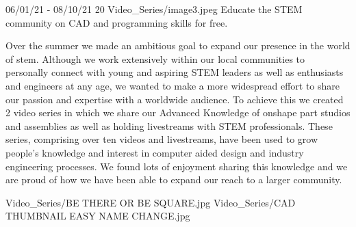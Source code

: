 {06/01/21 - 08/10/21}
{20}
{Video_Series/image3.jpeg}
{Educate the STEM community on CAD and programming skills for free.} 
{
Over the summer we made an ambitious goal to expand our presence in the world of stem. Although we work extensively within our local communities to personally connect with young and aspiring STEM leaders as well as enthusiasts and engineers at any age, we wanted to make a more widespread effort to share our passion and expertise with a worldwide audience. To achieve this we created 2 video series in which we share our Advanced Knowledge of onshape part studios and assemblies as well as holding livestreams with STEM professionals. These series, comprising over ten videos and livestreams, have been used to grow people’s knowledge and interest in computer aided design and industry engineering processes. We found lots of enjoyment sharing this knowledge and we are proud of how we have been able to expand our reach to a larger community. 

} 
{Video_Series/BE THERE OR BE SQUARE.jpg}
{Video_Series/CAD THUMBNAIL EASY NAME CHANGE.jpg}
